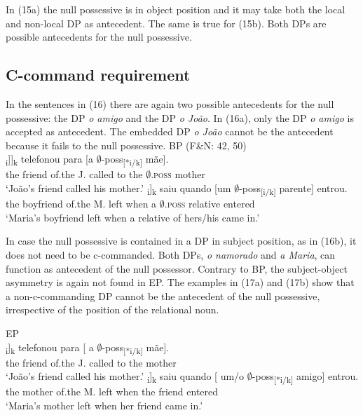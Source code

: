\documentclass[output=paper]{langsci/langscibook}
\begin{document}
In (15a) the null possessive is in object position and it may take both the local and non-local DP as antecedent. The same is true for (15b). Both DPs are possible antecedents for the null possessive.

\subsection{C-command requirement}%

In the sentences in (16) there are again two possible antecedents for the null possessive: the DP \textit{o amigo} and the DP \textit{o João}. In (16a), only the DP \textit{o amigo} is accepted as antecedent. The embedded DP \textit{o João} cannot be the antecedent because it fails to  the null possessive.
\pagebreak
\ea%
    BP (F\&N: 42, 50)\label{ex:wein:16}\\
    \ea
    \gll\relax [O amigo [d[o João]\textsubscript{i}]]\textsubscript{k} telefonou para [a $\emptyset$-poss\textsubscript{[}\textsubscript{*i/k]} mãe].\\
         the friend of.the J. called to the $\emptyset$\textsc{.poss} mother\\
    \glt ‘João’s friend called his mother.’
    \ex  
    \gll\relax [O namorado d[a Maria]\textsubscript{i}]\textsubscript{k} saiu quando [um $\emptyset$-poss\textsubscript{[i/}\textsubscript{k]} parente] entrou.\\
         the boyfriend of.the M. left when a $\emptyset$\textsc{.poss} relative entered\\
    \glt ‘Maria’s boyfriend left when a relative of hers\slash his came in.’
    \z
\z

In case the null possessive is contained in a DP in subject position, as in (16b), it does not need to be c-commanded. Both DPs, \textit{o namorado} and \textit{a Maria}, can function as antecedent of the null possessor. Contrary to BP, the subject-object asymmetry is again not found in EP. The examples in (17a) and (17b) show that a non-c-commanding DP cannot be the antecedent of the null possessive, irrespective of the position of the relational noun.

\ea%
    EP\label{ex:wein:17}\\
    \ea
    \gll [ O amigo d[o João]\textsubscript{i}]\textsubscript{k} telefonou para [ a $\emptyset$-poss\textsubscript{[*}\textsubscript{i/k]} mãe].\\
         {} the friend of.the J. called to {} the {} mother\\
    \glt ‘João’s friend called his mother.’
    \ex  
    \gll [ A mãe d[a Maria]\textsubscript{i}]\textsubscript{k} saiu quando [ um/o $\emptyset$-poss\textsubscript{[*i/k]} amigo] entrou. \\
         {} the mother of.the M. left when {} the {} friend entered \\
    \glt ‘Maria’s mother left when her friend came in.’ 
    \z
\z
\end{document}
